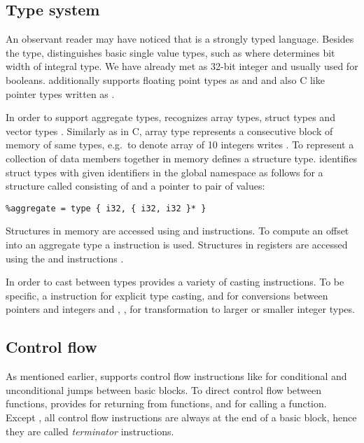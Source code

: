 \subsection{Type system} \label{subsec:typesystem}

An observant reader may have noticed that \LLVMIR is a strongly typed language.
Besides the  type, \LLVM distinguishes basic single value types, such as
 where  determines bit width of integral type. We have already met 
as 32-bit integer and  usually used for booleans.
\LLVM additionally supports floating point types as  and  and also C like pointer types written as .

In order to support aggregate types, \LLVM recognizes array types, struct types
and vector types \cite{LLVM:langref}. Similarly as in C, array type represents a consecutive block
of memory of same types, e.g.~to denote array of 10 integers \LLVM writes
\code{[10 × i32]}. To represent a collection of data members together in memory \LLVM
defines a structure type. \LLVM identifies struct types with given
identifiers in the global namespace as follows for a structure called 
consisting of  and a pointer to pair of  values:

\begin{verbatim}
%aggregate = type { i32, { i32, i32 }* }
\end{verbatim}

Structures in memory are accessed using  and  instructions. To
compute an offset into an aggregate type a  instruction is used.
Structures in registers are accessed using the  and 
instructions \cite{LLVM:langref}.

In order to cast between types \LLVM provides a variety of casting instructions.
To be specific, a  instruction for explicit type casting,  and
 for conversions between pointers and integers and , ,
 for transformation to larger or smaller integer types.

\subsection{Control flow} \label{subsec:controlflow}

As mentioned earlier, \LLVM supports control flow instructions like  for
conditional and unconditional jumps between basic blocks. To direct control flow
between functions, \LLVM provides  for returning from functions,  and
 for calling a function. Except , all control flow instructions
are always at the end of a basic block, hence they are called \emph{terminator}
instructions.

